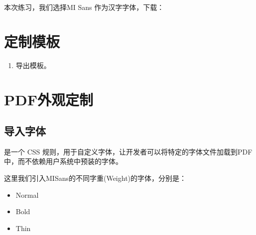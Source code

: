 \documentclass[letterpaper,10pt,english]{sphinxmanual}
\begin{document}
\sphinxAtStartPar
本次练习，我们选择MI Sans 作为汉字字体，下载：


\section{定制模板}
\label{\detokenize{formatting/css-pdf:id3}}\begin{enumerate}
%
\item {} 
\sphinxAtStartPar
导出模板。

\end{enumerate}


\section{PDF外观定制}
\label{\detokenize{formatting/css-pdf:pdf}}

\subsection{导入字体}
\label{\detokenize{formatting/css-pdf:id4}}
\sphinxAtStartPar
{} 是一个 CSS 规则，用于自定义字体，让开发者可以将特定的字体文件加载到PDF中，而不依赖用户系统中预装的字体。

\sphinxAtStartPar
这里我们引入MISans的不同字重(Weight)的字体，分别是：
\begin{itemize}
\item {} 
\sphinxAtStartPar
Normal

\item {} 
\sphinxAtStartPar
Bold

\item {} 
\sphinxAtStartPar
Thin

\end{itemize}
\end{document}
